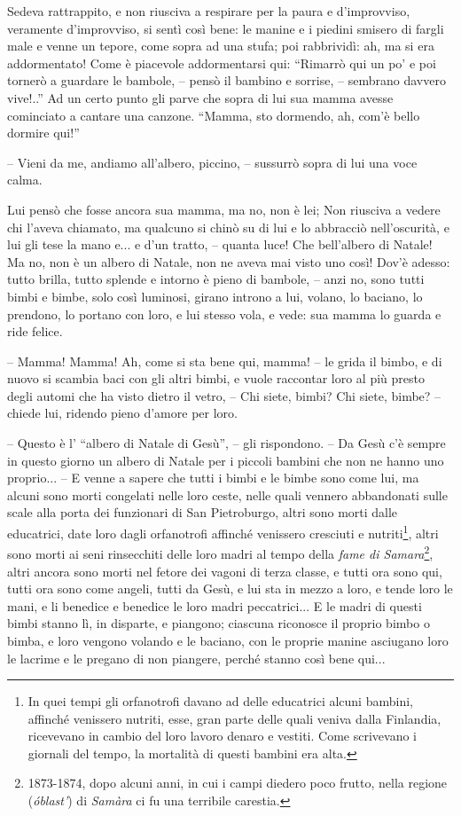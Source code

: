 \documentclass[a4paper, 12pt]{article}
\begin{document}
\begin{linenumbers}
	Sedeva rattrappito, e non riusciva a respirare per la paura e d'improvviso, veramente d'improvviso, si sentì così bene:
	le manine e i piedini smisero di fargli male e venne un tepore, come sopra ad una stufa; poi rabbrividì:
	ah, ma si era addormentato!
	Come è piacevole addormentarsi qui: ``Rimarrò qui un po' e poi tornerò a guardare le bambole, -- pensò il bambino e sorrise, -- sembrano davvero vive!..''
	Ad un certo punto gli parve che sopra di lui sua mamma avesse cominciato a cantare una canzone.
	``Mamma, sto dormendo, ah, com'è bello dormire qui!''
	
	-- Vieni da me, andiamo all'albero, piccino, -- sussurrò sopra di lui una voce calma.
	
	Lui pensò che fosse ancora sua mamma, ma no, non è lei;
	Non riusciva a vedere chi l'aveva chiamato, ma qualcuno si chinò su di lui e lo abbracciò nell'oscurità, e lui gli tese la mano e... e d'un tratto, -- quanta luce! Che bell'albero di Natale!
	Ma no, non è un albero di Natale, non ne aveva mai visto uno così!
	Dov'è adesso: tutto brilla, tutto splende e intorno è pieno di bambole, -- anzi no, sono tutti bimbi e bimbe, solo così luminosi, girano introno a lui, volano, lo baciano, lo prendono, lo portano con loro, e lui stesso vola, e vede: sua mamma lo guarda e ride felice.
	
	-- Mamma! Mamma! Ah, come si sta bene qui, mamma! -- le grida il bimbo, e di nuovo si scambia baci con gli altri bimbi, e vuole raccontar loro al più presto degli automi che ha visto dietro il vetro, -- Chi siete, bimbi? Chi siete, bimbe? -- chiede lui, ridendo pieno d'amore per loro.
	
	-- Questo è l' ``albero di Natale di Gesù'',  -- gli rispondono. -- Da Gesù c'è sempre in questo giorno un albero di Natale per i piccoli bambini che non ne hanno uno proprio... --
	E venne a sapere che tutti i bimbi e le bimbe sono come lui, ma alcuni sono morti congelati nelle loro ceste, nelle quali vennero abbandonati sulle scale alla porta dei funzionari di San Pietroburgo, altri sono morti dalle educatrici, date loro dagli orfanotrofi affinché venissero cresciuti e nutriti\footnote{In quei tempi gli orfanotrofi davano ad delle educatrici alcuni bambini, affinché venissero nutriti, esse, gran parte delle quali veniva dalla Finlandia, ricevevano in cambio del loro lavoro denaro e vestiti. Come scrivevano i giornali del tempo, la mortalità di questi bambini era alta.}, altri sono morti ai seni rinsecchiti delle loro madri al tempo della \textit{fame di Samara}\footnote{1873-1874, dopo alcuni anni, in cui i campi diedero poco frutto, nella regione (\textit{óblast'}) di \textit{Samàra} ci fu  una terribile carestia.}, altri ancora sono morti nel fetore dei vagoni di terza classe, e tutti ora sono qui, tutti ora sono come angeli, tutti da Gesù, e lui sta in mezzo a loro, e tende loro le mani, e li benedice e  benedice le loro madri peccatrici...
	E le madri di questi bimbi stanno lì, in disparte, e piangono;
	ciascuna riconosce il proprio bimbo o bimba, e loro vengono volando e le baciano, con le proprie manine asciugano loro le lacrime e le pregano di non piangere, perché stanno così bene qui...
	

\end{linenumbers}
\end{document}
